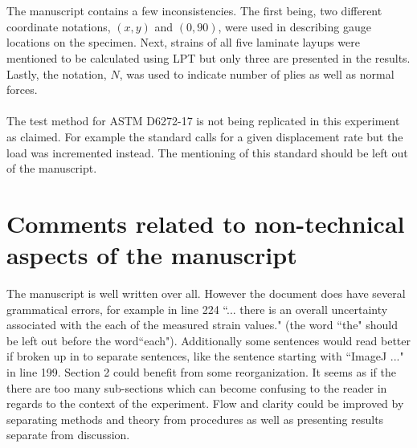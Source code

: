 \documentclass[12pt]{article}
\begin{document}
\\
\\
The manuscript contains a few inconsistencies. The first being, two different coordinate notations, $(x,y)$ and $(0,90)$, were used in describing  gauge locations on the specimen. Next, strains of all five laminate layups were mentioned to be calculated using LPT but only three are presented in the results. Lastly, the notation, $N$, was used to indicate number of plies as well as normal forces.
\\
\\
The test method for ASTM D6272-17 is not being replicated in this experiment as claimed. For example the standard calls for a given displacement rate but the load was incremented instead. The mentioning of this standard should be left out of the manuscript.  
\section*{Comments related to non-technical aspects of the manuscript} 

The manuscript is well written over all. However the document does have several grammatical errors, for example in line 224 ``... there is an overall uncertainty associated with the each of the measured strain values." (the word ``the" should be left out before the word``each"). Additionally some sentences would read better if broken up in to separate sentences, like the sentence starting with ``ImageJ ..." in line 199. 
Section 2 could benefit from some reorganization. It seems as if the there are too many sub-sections which can become confusing to the reader in regards to the context of the experiment.  Flow and clarity could be improved by separating methods and theory from procedures as well as presenting results separate from discussion.
\end{document}
